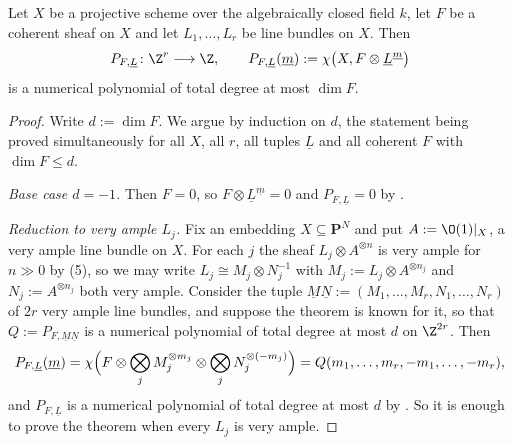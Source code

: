 \begin{theorem}[Snapper]\label{thm:deg-snapper}
Let $X$ be a projective scheme over the algebraically closed field $k$, let $F$
be a coherent sheaf on $X$ and let $L_1,\dots,L_r$ be line bundles on $X$.
Then
\[
  P_{F,\underline L}\colon\Z^r\longrightarrow\Z,\qquad
  P_{F,\underline L}(\underline m):=
  \chi\bigl(X,F\otimes\underline L^{\underline m}\bigr)
\]
is a numerical polynomial of total degree at most $\dim F$.
\end{theorem}
\begin{proof}
Write $d:=\dim F$.  We argue by induction on $d$, the statement being proved
simultaneously for all $X$, all $r$, all tuples $\underline L$ and all
coherent $F$ with $\dim F\leq d$.

\emph{Base case $d=-1$.}  Then $F=0$, so $F\otimes\underline L^{\underline m}=0$
and $P_{F,\underline L}=0$ by .

\emph{Reduction to very ample $L_j$.}  Fix an embedding $X\subseteq\mathbf P^N$
and put $A:=\O(1)|_X$, a very ample line bundle on $X$.  For each $j$ the sheaf
$L_j\otimes A^{\otimes n}$ is very ample for $n\gg0$ by
(5), so we may write
$L_j\cong M_j\otimes N_j^{-1}$ with $M_j:=L_j\otimes A^{\otimes n_j}$ and
$N_j:=A^{\otimes n_j}$ both very ample.  Consider the tuple
$\underline M\underline N:=(M_1,\dots,M_r,N_1,\dots,N_r)$ of $2r$ very ample
line bundles, and suppose the theorem is known for it, so that
$Q:=P_{F,\underline M\underline N}$ is a numerical polynomial of total degree
at most $d$ on $\Z^{2r}$.  Then
\[
  P_{F,\underline L}(\underline m)
  =\chi\Bigl(F\otimes\bigotimes_jM_j^{\otimes m_j}\otimes
  \bigotimes_jN_j^{\otimes(-m_j)}\Bigr)
  =Q(m_1,\dots,m_r,-m_1,\dots,-m_r),
\]
and $P_{F,\underline L}$ is a numerical polynomial of total degree at most $d$
by .  So it is enough to prove the
theorem when every $L_j$ is very ample.


\end{proof}
